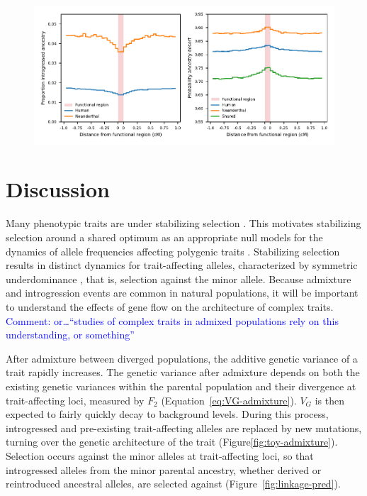 \documentclass{article}
\newcommand{\aprcomment}[1]{{\textcolor{blue}{Comment: #1}}}
\begin{document}
\begin{figure}[t!]
    \centering
    \includegraphics{../figures/introgression_deserts.SD_0.02.pdf}
    \caption{
        \textbf{}
    }
    \label{fig:deserts}
\end{figure}

\section*{Discussion}

Many phenotypic traits are under stabilizing selection
\citep{hodgins2015gene,sanjak2018evidence,sella2019thinking}. This motivates
stabilizing selection around a shared optimum as an appropriate null models for
the dynamics of allele frequencies affecting polygenic traits
\citep{yair2022population}. Stabilizing selection results in distinct dynamics
for trait-affecting alleles, characterized by symmetric underdominance
\citep{robertson1956effect,keightley1988quantitative}, that is, selection
against the minor allele. Because admixture and introgression events are common
in natural populations, it will be important to understand the effects of gene
flow on the architecture of complex traits.  \aprcomment{or\dots``studies of
complex traits in admixed populations rely on this understanding, or
something''}

After admixture between diverged populations, the additive genetic variance of
a trait rapidly increases. The genetic variance after admixture depends on both
the existing genetic variances within the parental population and their
divergence at trait-affecting loci, measured by $F_2$
(Equation~\ref{eq:VG-admixture}). $V_G$ is then expected to fairly quickly
decay to background levels. During this process, introgressed and pre-existing
trait-affecting alleles are replaced by new mutations, turning over the genetic
architecture of the trait (Figure\ref{fig:toy-admixture}). Selection occurs
against the minor alleles at trait-affecting loci, so that introgressed alleles
from the minor parental ancestry, whether derived or reintroduced ancestral
alleles, are selected against (Figure~\ref{fig:linkage-pred}).
\end{document}
